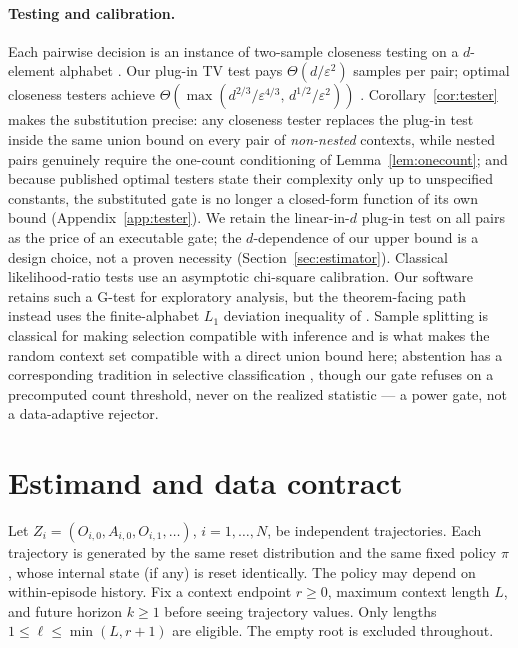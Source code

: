 \documentclass{article}
\newcommand{\eps}{\varepsilon}
\begin{document}
\paragraph{Testing and calibration.}
Each pairwise decision is an instance of two-sample closeness testing on a
$d$-element alphabet \citep{batu2000testing}.  Our plug-in TV test pays
$\Theta(d/\eps^2)$ samples per pair; optimal closeness testers achieve
$\Theta(\max(d^{2/3}/\eps^{4/3},\, d^{1/2}/\eps^2))$ \citep{chan2014optimal}.
Corollary~\ref{cor:tester} makes the substitution precise: any closeness
tester replaces the plug-in test inside the same union bound on every pair
of \emph{non-nested} contexts, while nested pairs genuinely require the
one-count conditioning of Lemma~\ref{lem:onecount}; and because published
optimal testers state their complexity only up to unspecified constants,
the substituted gate is no longer a closed-form function of its own bound
(Appendix~\ref{app:tester}).  We retain
the linear-in-$d$ plug-in test on all pairs as the price of an executable
gate; the $d$-dependence of our upper bound
is a design choice, not a proven necessity
(Section~\ref{sec:estimator}).  Classical likelihood-ratio tests use an
asymptotic chi-square calibration.  Our software retains such a G-test for
exploratory analysis, but the theorem-facing path instead uses the
finite-alphabet $L_1$ deviation inequality of \citet{weissman2003l1}.
Sample splitting is classical for making selection compatible with
inference \citep{cox1975note,wasserman2009high} and is what makes the random
context set compatible with a direct union bound here; abstention has a
corresponding tradition in selective classification
\citep{chow1970optimum,elyaniv2010foundations}, though our gate refuses on a
precomputed count threshold, never on the realized statistic --- a power
gate, not a data-adaptive rejector.

\section{Estimand and data contract}

Let $Z_i=(O_{i,0},A_{i,0},O_{i,1},\ldots)$, $i=1,\ldots,N$, be independent
trajectories.  Each trajectory is generated by the same reset distribution
and the same fixed policy $\pi$, whose internal state (if any) is reset
identically.  The policy may depend on within-episode history.  Fix a context
endpoint $r\ge0$, maximum context length $L$, and future horizon $k\ge1$ before
seeing trajectory values.  Only lengths $1\le \ell\le\min(L,r+1)$ are
eligible.  The empty root is excluded throughout.
\end{document}
